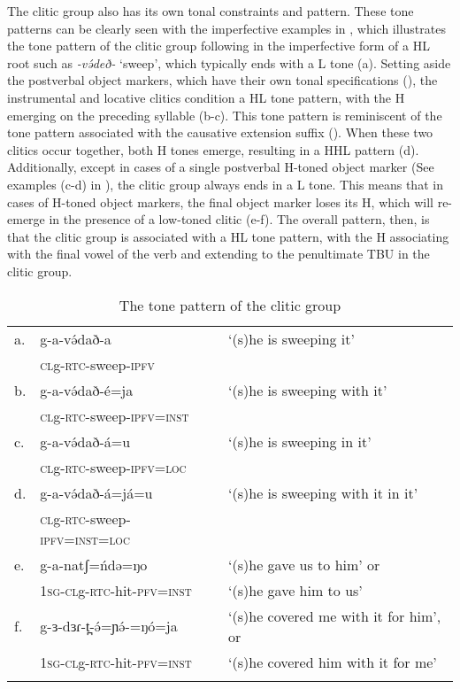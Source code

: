 The clitic group also has its own tonal constraints and pattern. These tone patterns can be clearly seen with the imperfective examples in , which illustrates the tone pattern of the clitic group following in the imperfective form of a HL root such as \textit{-və́deð-} `sweep', which typically ends with a L tone (a). Setting aside the postverbal object markers, which have their own tonal specifications (), the instrumental and locative clitics condition a HL tone pattern, with the H emerging on the preceding syllable (b-c). This tone pattern is reminiscent of the tone pattern associated with the causative extension suffix (). When these two clitics occur together, both H tones emerge, resulting in a HHL pattern (d). Additionally, except in cases of a single postverbal H-toned object marker (See examples (c-d) in ), the clitic group always ends in a L tone. This means that in cases of H-toned object markers, the final object marker loses its H, which will re-emerge in the presence of a low-toned clitic (e-f). The overall pattern, then, is that the clitic group is associated with a HL tone pattern, with the H associating with the final vowel of the verb and extending to the penultimate TBU in the clitic group.

\begin{table} %
\caption{The tone pattern of the clitic group} \label{tab:ch11:clitictone}
\begin{tabular}[t]{lll}
\lsptoprule 
a. & g-a-və́dað-a & `(s)he is sweeping it'\\
 	& \textsc{cl}g-\textsc{rtc}-sweep-\textsc{ipfv} & \\
b. & g-a-və́dað-é=ja & `(s)he is sweeping with it'\\
 	& \textsc{cl}g-\textsc{rtc}-sweep-\textsc{ipfv}=\textsc{inst} & \\
c. & g-a-və́dað-á=u & `(s)he is sweeping in it'\\
 	& \textsc{cl}g-\textsc{rtc}-sweep-\textsc{ipfv}=\textsc{loc} & \\
d. &  g-a-və́dað-á=já=u & `(s)he is sweeping with it in it'\\
 	& \textsc{cl}g-\textsc{rtc}-sweep-\textsc{ipfv}=\textsc{inst}=\textsc{loc} & \\
e. & g-a-natʃ=ńdə=ŋo & `(s)he gave us to him' or \\
 	& \textsc{1sg}-\textsc{cl}g-\textsc{rtc}-hit-\textsc{pfv}=\textsc{inst} & `(s)he gave him to us' \\
f. & g-ɜ-dɜɾ-t̪-ə́=ɲə́-=ŋó=ja & `(s)he covered me with it for him', or \\
 	& \textsc{1sg}-\textsc{cl}g-\textsc{rtc}-hit-\textsc{pfv}=\textsc{inst} & `(s)he covered him with it for me'\\
\lspbottomrule
\end{tabular}
\end{table}

